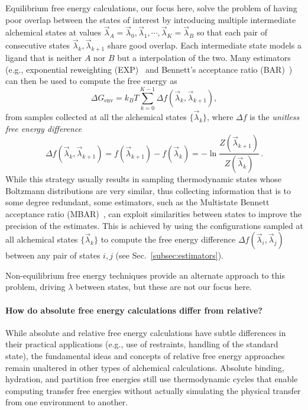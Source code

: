 \documentclass[9pt,bestpractices]{livecoms}
\begin{document}
Equilibrium free energy calculations, our focus here, solve the problem of having poor overlap between the states of interest by introducing multiple intermediate alchemical states at values $\vec{\lambda}_A = \vec{\lambda}_0, \vec{\lambda}_1, \cdots, \vec{\lambda}_K = \vec{\lambda}_B$ so that each pair of consecutive states $\vec{\lambda}_k, \vec{\lambda}_{k+1}$ share good overlap.
Each intermediate state models a ligand that is neither $A$ nor $B$ but a interpolation of the two.
Many estimators (e.g., exponential reweighting (EXP)~\cite{zwanzig1954hightemperature} and Bennett's acceptance ratio (BAR)~\cite{bennett1976efficient,shirts2003equilibrium}) can then be used to compute the free energy as
\begin{equation}
    \Delta G_{\mathrm{env}} = k_BT \sum_{k=0}^{K-1} \Delta f(\vec{\lambda}_k, \vec{\lambda}_{k+1}),
\end{equation}
from samples collected at all the alchemical states $\{\vec{\lambda}_k \}$, where $\Delta f$ is the \emph{unitless free energy difference}
\begin{equation}
    \Delta f(\vec{\lambda}_k, \vec{\lambda}_{k+1}) = f(\vec{\lambda}_{k+1}) - f(\vec{\lambda}_k) = - \ln \frac{Z(\vec{\lambda}_{k+1})}{Z(\vec{\lambda}_k)} \, .
\end{equation}
While this strategy usually results in sampling thermodynamic states whose Boltzmann distributions are very similar, thus collecting information that is to some degree redundant, some estimators, such as the Multistate Bennett acceptance ratio (MBAR)~\cite{shirts2008statisticallya}, can exploit similarities between states to improve the precision of the estimates. This is achieved by using the configurations sampled at all alchemical states $\{\vec{\lambda}_k \}$ to compute the free energy difference $\Delta f(\vec{\lambda}_i, \vec{\lambda}_{j})$ between any pair of states $i,j$ (see Sec.~\ref{subsec:estimators}).

Non-equilibrium free energy techniques provide an alternate approach to this problem, driving $\lambda$ between states, but these are not our focus here.~\cite{jarzynski1997nonequilibrium,jarzynski1998equilibrium,crooks2000pathensemble, gapsys2020large}

\paragraph{How do absolute free energy calculations differ from relative?}

While absolute and relative free energy calculations have subtle differences in their practical applications (e.g., use of restraints, handling of the standard state), the fundamental ideas and concepts of relative free energy approaches remain unaltered in other types of alchemical calculations.
Absolute binding, hydration, and partition free energies still use thermodynamic cycles that enable computing transfer free energies without actually simulating the physical transfer from one environment to another.
\end{document}
